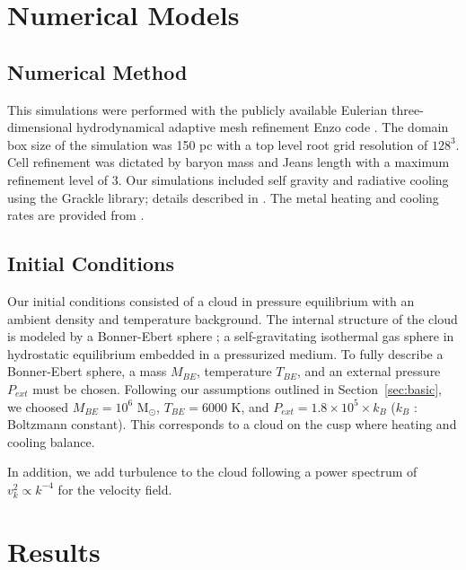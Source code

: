 \documentclass[useAMS,usenatbib]{mn2e}
\newcommand{\msun}{{M$_\odot$}}
\begin{document}





%
\section{Numerical Models}
\label{sec:numerical}
\subsection{Numerical Method}
This simulations were performed with the publicly available Eulerian three-dimensional
hydrodynamical adaptive mesh refinement Enzo code \citep{Bryan2013}. The domain
box size of the simulation was 150 pc with a top level root grid resolution of $128^3$.
Cell refinement was dictated by baryon mass and Jeans length with a maximum refinement
level of 3. Our simulations included self gravity and radiative cooling using the
Grackle library; details described in \cite{Bryan2013}. The metal heating and
cooling rates are provided from \cite{Haardt2012}.

\subsection{Initial Conditions}
Our initial conditions consisted of a cloud in pressure equilibrium with an
ambient density and temperature background. The internal structure of the
cloud is modeled by a Bonner-Ebert sphere \cite{Bonnor1956}; a self-gravitating
isothermal gas sphere in hydrostatic equilibrium embedded in a pressurized  
medium. To fully describe a Bonner-Ebert sphere, a mass $M_{BE}$, temperature
$T_{BE}$, and an external pressure $P_{ext}$ must be chosen. Following our
assumptions outlined in Section~\ref{sec:basic}, we choosed
$M_{BE}=10^6$ \msun, $T_{BE}=6000$ K, and $P_{ext}=1.8\times10^5\times k_B$
($k_B$ : Boltzmann constant). This corresponds to a cloud on the cusp where
heating and cooling balance. 

In addition, we add turbulence to the cloud following a power spectrum of
$v_k^2 \propto k^{-4}$ for the velocity field.

% 
\section{Results}
\label{sec:results}
\end{document}
